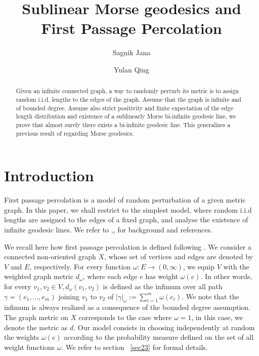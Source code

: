 \documentclass[12 pt]{amsart}
\title[Sublinearly Morse geodesics and First Passage Percolation]{Sublinear Morse geodesics and First Passage Percolation}
\author{Sagnik Jana}
\author{Yulan Qing}
\theoremstyle{definition}
\theoremstyle{remark}
\begin{document}
\maketitle
\begin{abstract}
Given an infinite connected graph, a way to randomly perturb its metric is to assign random i.i.d. lengths to the edges of the graph. Assume that the graph is infinite and of bounded degree. Assume also strict positivity and finite expectation of the edge length distribution and existence of a sublinearly Morse bi-infinite geodesic line, we prove that  almost surely there exists a bi-infinite geodesic line. This generalizes a previous result of \cite{BT17} regarding Morse geodesics.  
\end{abstract}

\section{Introduction}
First passage percolation is a model of random perturbation of a given metric graph. In this paper, we shall restrict to the simplest model, where random i.i.d lengths are assigned to the edges of a fixed graph,  and analyse the existence of infinite geodesic lines. We refer to \cite{ADH15},\cite{GK12},\cite{Kesten} for background and references.

We recall here how first passage percolation is defined following \cite{BT17}. We consider a connected non-oriented graph $X$, whose set of vertices and edges are denoted by $V$ and $E$, respectively. For every function $\omega: E \rightarrow(0, \infty)$, we equip $V$ with the weighted graph metric $d_{\omega}$, where each edge $e$ has weight $\omega(e)$. In other words, for every $v_{1}, v_{2} \in V, d_{\omega}\left(v_{1}, v_{2}\right)$ is defined as the infimum over all path $\gamma=\left(e_{1}, \ldots, e_{m}\right)$ joining $v_{1}$ to $v_{2}$ of $|\gamma|_{\omega}:=\sum_{i=1}^{m} \omega\left(e_{i}\right)$. We note that the infimum is always realized as a consequence of the bounded degree assumption. The graph metric on $X$ corresponds to the case where $\omega =1$, in this case, we denote the metric as $d$. Our model consists in choosing independently at random the weights $\omega(e)$ according to the probability measure defined on the set of all weight functions $\omega$. We refer to section ~\ref{sec23} for formal details.  %
\end{document}
